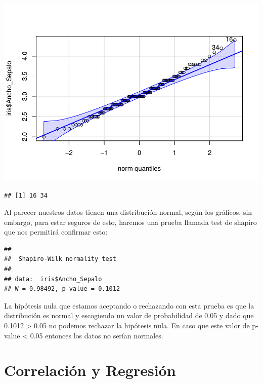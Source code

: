 \documentclass[
]{book}
\newenvironment{Shaded}{\begin{snugshade}}{\end{snugshade}}
\newcommand{\FunctionTok}[1]{\textcolor[rgb]{0.13,0.29,0.53}{\textbf{#1}}}
\newcommand{\NormalTok}[1]{#1}
\newcommand{\SpecialCharTok}[1]{\textcolor[rgb]{0.81,0.36,0.00}{\textbf{#1}}}
\begin{document}
\includegraphics{R_Manual_files/figure-latex/unnamed-chunk-249-1.pdf}

\begin{verbatim}
## [1] 16 34
\end{verbatim}

Al parecer nuestros datos tienen una distribución normal, según los gráficos, sin embargo, para estar seguros de esto, haremos una prueba llamada test de shapiro que nos permitirá confirmar esto:\\

\begin{Shaded}
\end{Shaded}

\begin{verbatim}
## 
##  Shapiro-Wilk normality test
## 
## data:  iris$Ancho_Sepalo
## W = 0.98492, p-value = 0.1012
\end{verbatim}

\hfill\break

La hipótesis nula que estamos aceptando o rechazando con esta prueba es que la distribución es normal y escogiendo un valor de probabilidad de 0.05 y dado que 0.1012 \textgreater{} 0.05 no podemos rechazar la hipótesis nula.
En caso que este valor de p-value \textless{} 0.05 entonces los datos no serían normales.

\section{Correlación y Regresión}\label{correlaciuxf3n-y-regresiuxf3n}
\end{document}
